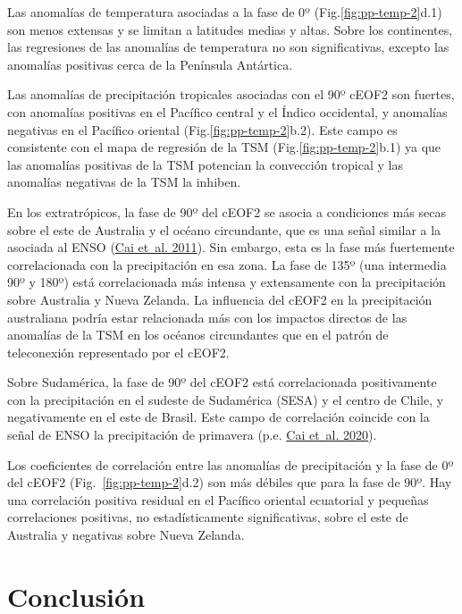 \documentclass[12pt,oneside,a4paper]{reedthesis}
\begin{document}
Las anomalías de temperatura asociadas a la fase de 0º (Fig.\ref{fig:pp-temp-2}d.1) son menos extensas y se limitan a latitudes medias y altas.
Sobre los continentes, las regresiones de las anomalías de temperatura no son significativas, excepto las anomalías positivas cerca de la Península Antártica.

Las anomalías de precipitación tropicales asociadas con el 90º cEOF2 son fuertes, con anomalías positivas en el Pacífico central y el Índico occidental, y anomalías negativas en el Pacífico oriental (Fig.\ref{fig:pp-temp-2}b.2).
Este campo es consistente con el mapa de regresión de la TSM (Fig.\ref{fig:pp-temp-2}b.1) ya que las anomalías positivas de la TSM potencian la convección tropical y las anomalías negativas de la TSM la inhiben.

En los extratrópicos, la fase de 90º del cEOF2 se asocia a condiciones más secas sobre el este de Australia y el océano circundante, que es una señal similar a la asociada al ENSO (\protect\hyperlink{ref-cai2011}{Cai et~al. 2011}).
Sin embargo, esta es la fase más fuertemente correlacionada con la precipitación en esa zona.
La fase de 135º (una intermedia 90º y 180º) está correlacionada más intensa y extensamente con la precipitación sobre Australia y Nueva Zelanda.
La influencia del cEOF2 en la precipitación australiana podría estar relacionada más con los impactos directos de las anomalías de la TSM en los océanos circundantes que en el patrón de teleconexión representado por el cEOF2.

Sobre Sudamérica, la fase de 90º del cEOF2 está correlacionada positivamente con la precipitación en el sudeste de Sudamérica (SESA) y el centro de Chile, y negativamente en el este de Brasil.
Este campo de correlación coincide con la señal de ENSO la precipitación de primavera (p.e. \protect\hyperlink{ref-cai2020a}{Cai et~al. 2020}).

Los coeficientes de correlación entre las anomalías de precipitación y la fase de 0º del cEOF2 (Fig.~\ref{fig:pp-temp-2}d.2) son más débiles que para la fase de 90º.
Hay una correlación positiva residual en el Pacífico oriental ecuatorial y pequeñas correlaciones positivas, no estadísticamente significativas, sobre el este de Australia y negativas sobre Nueva Zelanda.

\hypertarget{conclusiuxf3n}{%
\section{Conclusión}\label{conclusiuxf3n}}
\end{document}
